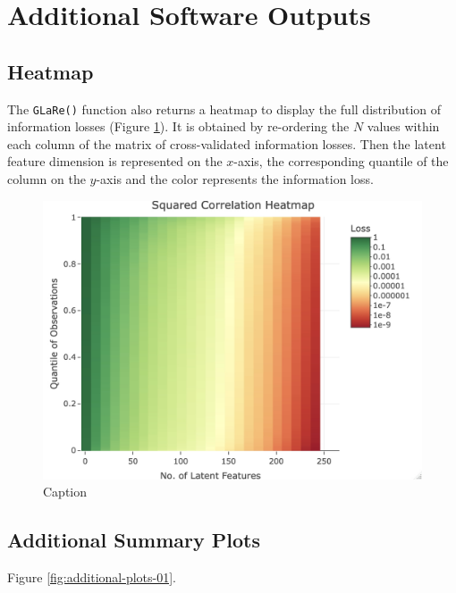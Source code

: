 \section{Additional Software Outputs}\label{sec:additional-outputs}


\subsection{Heatmap}

The \texttt{GLaRe()} function also returns a heatmap to display the full distribution of information losses (Figure \ref{fig:eye-heatmap}).
It is obtained by re-ordering the $N$ values within each column of the matrix of cross-validated information losses.
Then the latent feature dimension is represented on the $x$-axis, the corresponding quantile of the column on the $y$-axis and the color represents the information loss.


\begin{figure}
    \centering
    \includegraphics[width=0.75\linewidth]{figures/eye-heatmap.jpeg}
    \caption{Caption}
    \label{fig:eye-heatmap}
\end{figure}

\subsection{Additional Summary Plots}

Figure \ref{fig:additional-plots-01}.

